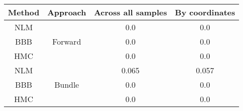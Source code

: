 \documentclass[convert={outext=.png}]{standalone}
\begin{document}
\centering
\label{tab:experimental_results}

\begin{tabular}{c c c c}

\hline
\hline
 Method & Approach & Across all samples & By coordinates \\ \hline
 NLM & \multirow{3}{*}{Forward} & 0.0 & 0.0 \\
 BBB &  & 0.0 & 0.0 \\
 HMC &  & 0.0 & 0.0 \\
 \hline
 NLM & \multirow{3}{*}{Bundle} & 0.065 & 0.057 \\
 BBB &  & 0.0 & 0.0 \\
 HMC &  & 0.0 & 0.0 \\
\hline
\hline
\end{tabular}
\end{document}
